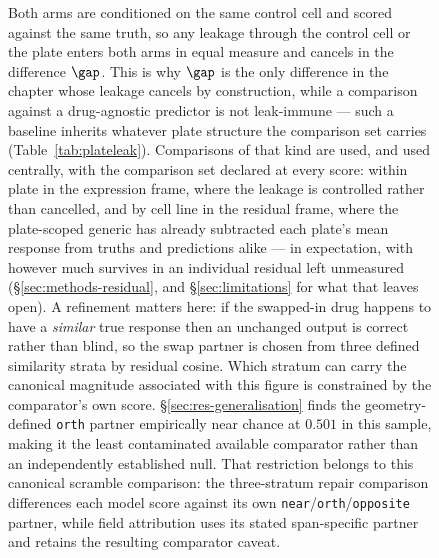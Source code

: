 \begin{figure}[htbp]
\begin{tikzpicture}
\end{tikzpicture}
\caption[The scramble ablation]{ Both arms are conditioned on the same control cell and scored against the same truth,
so any leakage through the control cell or the plate enters both arms in equal measure and cancels in
the difference $\gap$. This is why $\gap$ is the only difference in the chapter whose leakage cancels
by construction, while a comparison against a drug-agnostic predictor is not leak-immune --- such a
baseline inherits whatever plate structure the comparison set carries
(Table~\ref{tab:plateleak}). Comparisons of that kind are used, and used centrally, with the
comparison set declared at every score: within plate in the expression frame, where the leakage is
controlled rather than cancelled, and by cell line in the residual frame, where the plate-scoped
generic has already subtracted each plate's mean response from truths and predictions alike --- in
expectation, with however much survives in an individual residual left unmeasured
(\S\ref{sec:methods-residual}, and \S\ref{sec:limitations} for what that leaves open).
A refinement matters here: if the swapped-in drug happens to have a
\emph{similar} true response then an unchanged output is correct rather than blind, so the swap
partner is chosen from three defined similarity strata by residual cosine. Which stratum can carry
the canonical magnitude associated with this figure is constrained by the comparator's own score.
\S\ref{sec:res-generalisation} finds the geometry-defined \texttt{orth} partner empirically near
chance at $0.501$ in this sample, making it the least contaminated available comparator rather than
an independently established null. That restriction belongs to this canonical scramble comparison:
the three-stratum repair comparison differences each model score against its own
\texttt{near}/\texttt{orth}/\texttt{opposite} partner, while field attribution uses its stated
span-specific partner and retains the resulting comparator caveat.}
\label{fig:scramble}
\end{figure}
